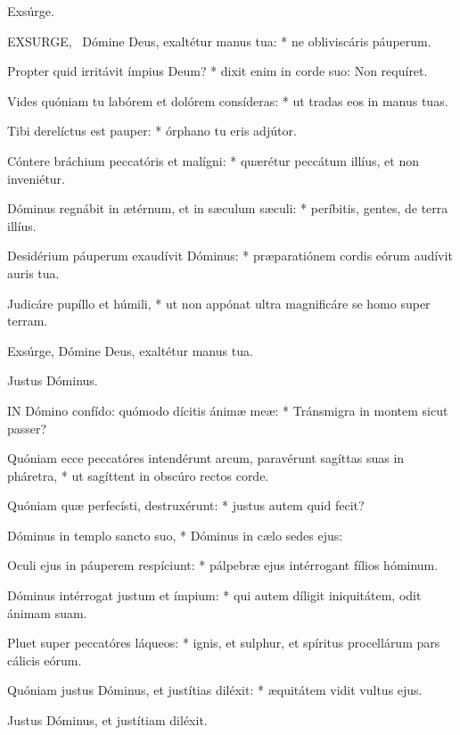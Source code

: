  Exsúrge. \textdagger


\lettrine[lines=2]{E}{XSURGE}, \textdagger\ Dómine Deus, exaltétur manus tua: * ne obliviscáris páuperum.

Propter quid irritávit ímpius Deum? * dixit enim in corde suo: Non requíret.

Vides quóniam tu labórem et dolórem consíderas: * ut tradas eos in manus tuas.

Tibi derelíctus est pauper: * órphano tu eris adjútor.

Cóntere bráchium peccatóris et malígni: * quærétur peccátum illíus, et non inveniétur.

Dóminus regnábit in ætérnum, et in sæculum sæculi: * períbitis, gentes, de terra illíus.

Desidérium páuperum exaudívit Dóminus: * præparatiónem cordis eórum audívit auris tua.

Judicáre pupíllo et húmili, * ut non appónat ultra magnificáre se homo super terram.

 Exsúrge, Dómine Deus, exaltétur manus tua.

 Justus Dóminus.


\lettrine[lines=2]{I}{N} Dómino confído: quómodo dícitis ánimæ meæ: * Tránsmigra in montem sicut passer?

Quóniam ecce peccatóres intendérunt arcum, paravérunt sagíttas suas in pháretra, * ut sagíttent in obscúro rectos corde.

Quóniam quæ perfecísti, destruxérunt: * justus autem quid fecit?

Dóminus in templo sancto suo, * Dóminus in cælo sedes ejus:

Oculi ejus in páuperem respíciunt: * pálpebræ ejus intérrogant fílios hóminum.

Dóminus intérrogat justum et ímpium: * qui autem díligit iniquitátem, odit ánimam suam.

Pluet super peccatóres láqueos: * ignis, et sulphur, et spíritus procellárum pars cálicis eórum.

Quóniam justus Dóminus, et justítias diléxit: * æquitátem vidit vultus ejus.


 Justus Dóminus, et justítiam diléxit.



